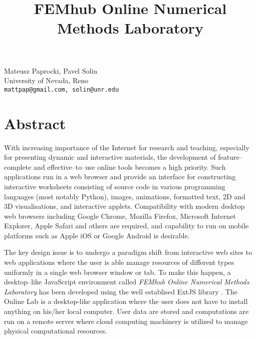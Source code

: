 \title{FEMhub Online Numerical Methods Laboratory}
\author{} \institute{}
\maketitle

\begin{center}
{\large Mateusz Paprocki, Pavel Solin}\\
University of Nevada, Reno\\
{\tt mattpap@gmail.com, solin@unr.edu}
\end{center}

\section*{Abstract}
With increasing importance of the Internet for research and teaching, especially for presenting dynamic and interactive materials, the development of feature--complete and effective--to--use online tools becomes a high priority. Such applications run in a web browser and provide an interface for constructing interactive worksheets consisting of source code in various programming languages (most notably Python), images, animations, formatted text, 2D and 3D visualisations, and interactive applets. Compatibility with modern desktop web browsers including Google Chrome, Mozilla Firefox, Microsoft Internet Explorer, Apple Safari and others are required, and capability to run on mobile platforms such as Apple iOS or Google Android is desirable. 

The key design issue is to undergo a paradigm shift from interactive web sites to web applications where the user is able manage resources of different types uniformly in a single web browser window or tab. To make this happen, a desktop--like JavaScript environment called {\em FEMhub Online Numerical Methods Laboratory} \cite{ol} has been developed using the well establised ExtJS library \cite{ExtJS}. The Online Lab is a desktop-like application where the user does not have to install anything on his/her local computer. User data are stored and computations are run on a remote server where cloud computing machinery is utilized to manage physical computational resources.

